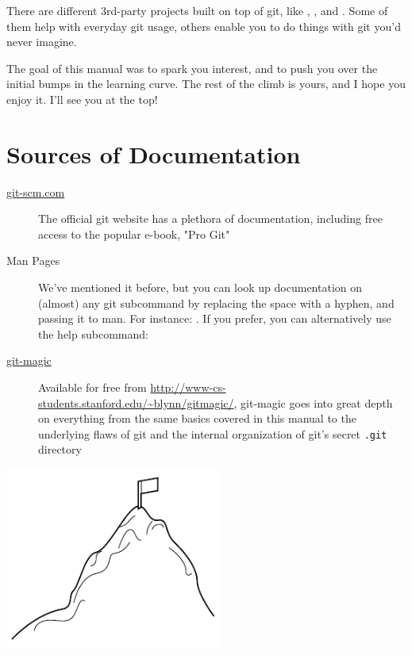 \documentclass[11pt,letterpaper,twoside]{report}
\begin{document}
There are different 3rd-party projects built on top of git, like
, , and . Some of them help
with everyday git usage, others enable you to do things with git you'd never
imagine.

The goal of this manual was to spark you interest, and to push you over the
initial bumps in the learning curve. The rest of the climb is yours, and I hope
you enjoy it. I'll see you at the top!

\section{Sources of Documentation}

\begin{description}
\item[\href{http://git-scm.com/documentation}{git-scm.com}]
    The official git website has a plethora of documentation, including free
    access to the popular e-book, "Pro Git"
\item[Man Pages]
    We've mentioned it before, but you can look up documentation on (almost) any
    git subcommand by replacing the space with a hyphen, and passing it to man.
    For instance: . If you prefer, you can alternatively use
    the help subcommand: 
\item[\href{http://www-cs-students.stanford.edu/~blynn/gitmagic/}{git-magic}]
    Available for free from
    \url{http://www-cs-students.stanford.edu/~blynn/gitmagic/}, git-magic goes
    into great depth on everything from the same basics covered in this manual
    to the underlying flaws of git and the internal organization of git's secret
    \texttt{.git} directory
\end{description}

\vspace{\fill}
\begin{flushright}
\includegraphics[height=6cm]{resources/learning_curve_abstract.pdf}
\end{flushright}
\vspace*{\fill}
\end{document}
